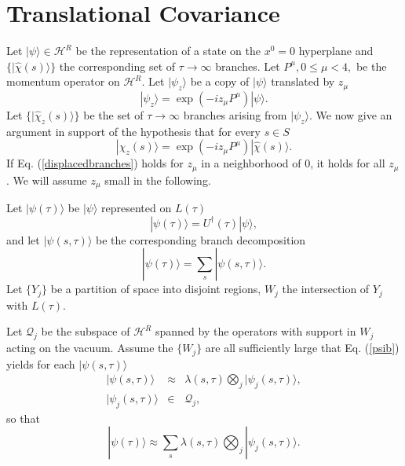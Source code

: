 \documentclass[12pt,amsmath,amssymb,onecolumn]{revtex4-2}
\begin{document}
\section{\label{sec:transcov} Translational Covariance}

Let $|\psi \rangle  \in \mathcal{H}^R$ be the 
representation of a state on the $x^0 = 0$ hyperplane
and $\{ |\hat{\chi}(s) \rangle  \}$ the corresponding
set of $\tau \rightarrow \infty$ branches.
Let $P^\mu, 0 \le \mu < 4,$ be the momentum operator
on $\mathcal{H}^R$. Let $|\psi_z \rangle $ be a copy
of $|\psi \rangle $ translated by $z_\mu$
\begin{equation}
  \label{psiz}
  |\psi_z \rangle  = \exp( -i  z_\mu P^\mu ) |\psi \rangle .
\end{equation}
Let $\{ |\hat{\chi}_z(s) \rangle  \}$ be the set of 
$\tau \rightarrow \infty$ branches arising
from $|\psi_z \rangle $. We now give
an argument in support of the hypothesis that
for every $s \in S$
\begin{equation}
  \label{displacedbranches}
  |\hat{\chi}_z(s) \rangle  = \exp( -i  z_\mu P^\mu ) |\hat{\chi}(s) \rangle .
\end{equation}
If Eq. (\ref{displacedbranches}) holds for 
$z_\mu$ in a neighborhood of 0, it holds for all $z_\mu$.
We will assume $z_\mu$ small in the following.

Let $|\psi(\tau) \rangle $ be $|\psi \rangle $ represented
on $L(\tau)$
\begin{equation}
  \label{psitau}
  |\psi( \tau) \rangle  =  U^\dagger( \tau) |\psi \rangle ,
\end{equation}
and let $|\psi( s, \tau) \rangle $ be the
corresponding branch decomposition 
\begin{equation}
  \label{branchdecomp}
  |\psi( \tau) \rangle  = \sum_s |\psi( s, \tau) \rangle .
\end{equation}
Let $\{ Y_j \}$ be a partition
of space into disjoint regions, $ W_j$ the
intersection of $Y_j$ with $L(\tau)$.


Let $\mathcal{Q}_j$ be the subspace of $\mathcal{H}^R$
spanned by the operators with support in $W_j$
acting on the vacuum.
Assume the $\{ W_j \}$
are all sufficiently large that Eq. (\ref{psib}) yields
for each $|\psi( s, \tau) \rangle $
\begin{subequations}
\begin{eqnarray}
  \label{psib1}
  |\psi(s, \tau) \rangle  & \approx &
  \lambda(s, \tau) \bigotimes_j |\psi_j(s, \tau) \rangle , \\
  \label{psib2}
  |\psi_j( s, \tau) \rangle  & \in & \mathcal{Q}_j,
\end{eqnarray}
\end{subequations}
so that
\begin{equation}
  \label{branchdecomp1}
  |\psi( \tau) \rangle  \approx \sum_s \lambda(s, \tau) \bigotimes_j |\psi_j(s, \tau) \rangle .
\end{equation}
\end{document}
